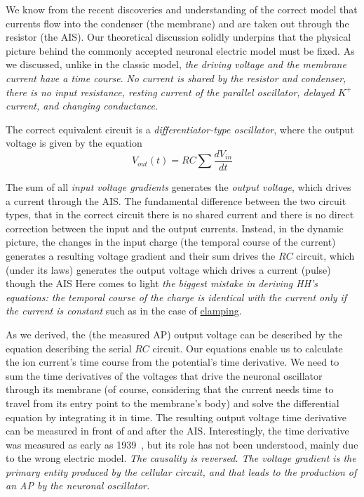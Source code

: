 We know from the recent discoveries and understanding of the correct
model that currents flow into the condenser (the membrane) and are
taken out through the resistor (the 
\gls{AIS}).
 Our theoretical discussion
solidly underpins that the physical picture behind the commonly accepted
neuronal electric model must be fixed. As we discussed, unlike in
the classic model, \emph{the driving voltage and the membrane current
have a time course}. \emph{No current is shared by the resistor and
condenser, there is no input resistance, resting current of the parallel
oscillator, delayed $K^{+}$ current, and changing conductance.}

The correct equivalent circuit is a \emph{differentiator-type oscillator},
where the output voltage is given by the equation
\begin{equation}
V_{out}(t)=RC\sum\frac{dV_{in}}{dt}\label{eq:NeuronVoltageOut}
\end{equation}

 The sum of all \textit{input voltage gradients} generates the \textit{output voltage}, which drives a current through the 
 AIS. The fundamental difference between the two circuit types, that in the correct circuit there is no shared current and there is no direct correction between the input and the output currents. Instead, in the dynamic picture, the changes in the input charge (the temporal course of the current)  generates a resulting voltage gradient
and their sum drives the $RC$ circuit, which (under its laws) generates the output voltage which 
drives a current (pulse) though  the 
AIS
Here comes to light \textit{the biggest mistake in deriving HH's equations: the temporal course of the charge
is identical with the current only if the current is constant} such as in the case of \hyperlink{voltage-clamping}{clamping}.

As we derived, the (the measured 
\gls{AP})
 output voltage can be
described by the equation describing the serial $RC$ circuit. Our
equations enable us to calculate the ion current's time course from
the potential's time derivative. We need to sum the time derivatives
of the voltages that drive the neuronal oscillator through its membrane
(of course, considering that the current needs time to travel from
its entry point to the membrane's body) and solve the differential
equation by integrating it in time. The resulting output voltage time
derivative can be measured in front of and after the
\gls{AIS}.
Interestingly,
the time derivative was measured as early as 1939~\cite{COLE_CURTIS_IMPEDANCE:1939},
but its role has not been understood, mainly due to the wrong electric
model. \emph{The causality is reversed. The voltage gradient is the
primary entity produced by the cellular circuit, and that leads to
the production of an \gls{AP} by the neuronal oscillator.}
 

